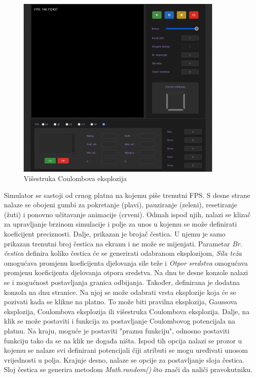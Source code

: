 \documentclass{foi}
\begin{document}
\begin{figure}[H]
    \centering
    \includegraphics[width=0.9\textwidth]{slike/21_Simulator.png}
    \captionsetup{justification=centering}
    \caption{Višestruka Coulombova eksplozija}
\label{fig:Simulator}
\end{figure}

Simulator se sastoji od crnog platna na kojemu piše trenutni FPS. S desne strane nalaze se obojeni gumbi za pokretanje (plavi), pauziranje (zeleni), resetiranje (žuti) i ponovno učitavanje animacije (crveni). Odmah ispod njih, nalazi se klizač za upravljanje brzinom simulacije i polje za unos u kojemu se može definirati koeficijent preciznosti. Dalje, prikazan je brojač čestica. U njemu je samo prikazan trenutni broj čestica na ekranu i ne može se mijenjati. Parametar \textit{Br. čestica} definira koliko čestica će se generirati odabranom eksplozijom, \textit{Sila teža} omogućava promjenu koeficijenta djelovanja sile teže i \textit{Otpor sredstva} omogućava promjenu koeficijenta djelovanja otpora sredstva. Na dnu te desne konzole nalazi se i mogućnost postavljanja granica odbijanja. Također, definirana je dodatna konzola na dnu stranice. Na njoj se može odabrati vrsta eksplozije koja će se pozivati kada se klikne na platno. To može biti pravilna eksplozija, Gaussova eksplozija, Coulombova eksplozija ili višestruka Coulombova eksplozija. Dalje, na klik se može postaviti i funkcija za postavljanje Coulombovog potencijala na platnu. Na kraju, moguće je postaviti "praznu funkciju", odnosno postaviti funkciju tako da se na klik ne događa ništa. Ispod tih opcija nalazi se prozor u kojemu se nalaze svi definirani potencijali čiji atributi se mogu uređivati unosom vrijednosti u polja. Krajnje desno, nalaze se opcije za postavljanje sloja čestica. Sloj čestica se generira metodom \textit{Math.random()} što znači da naliči pravokutniku. 
\end{document}
